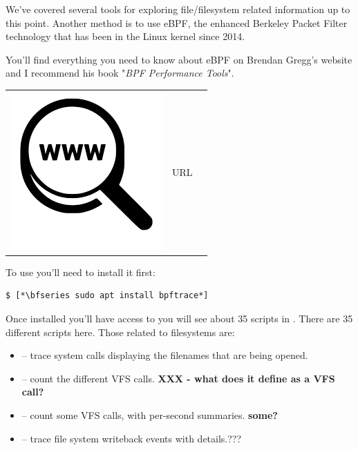 We've covered several tools for exploring file/filesystem related information up to this point. Another method is to use eBPF, the enhanced Berkeley Packet Filter technology that has been in the Linux kernel since 2014. 

You'll find everything you need to know about eBPF on Brendan Gregg's website and I recommend his book "\textit{BPF Performance Tools}".

\begin{table}[h]
\begin{tabular}{lcl}
\parbox[r]{0.5in}{\includegraphics[scale=0.15]{figures/url.png}} & \parbox[l]{0.5in}{URL } & \parbox[l]{3in}{}
\end{tabular}
\end{table}

\noindent
To use  you'll need to install it first:

\begin{lstlisting}
$ [*\bfseries sudo apt install bpftrace*]
\end{lstlisting}

\noindent
Once installed you'll have access to  you will see about 35 scripts in . There are 35 different scripts here. Those related to filesystems are:

\begin{itemize}
	\item {} -- trace  system calls displaying the filenames that are being opened.
	\item {} -- count the different VFS calls. \textbf{XXX - what does it define as a VFS call?}
	\item {} -- count some VFS calls, with per-second summaries. \textbf{some?}
	\item {} -- trace file system writeback events with details.???
\end{itemize}

